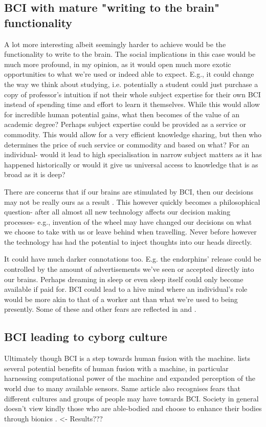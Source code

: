 \documentclass[fleqn,11pt]{olplainarticle}
\begin{document}
\subsection{BCI with mature "writing to the brain" functionality}
A lot more interesting albeit seemingly harder to achieve would be the functionality to write to the brain. The social implications in this case would be much more profound, in my opinion, as it would open much more exotic opportunities to what we're used or indeed able to expect. E.g., it could change the way we think about studying, i.e. potentially a student could just purchase a copy of professor's intuition if not their whole subject expertise for their own BCI instead of spending time and effort to learn it themselves. While this would allow for incredible human potential gains, what then becomes of the value of an academic degree? Perhaps subject expertise could be provided as a service or commodity. This would allow for a very efficient knowledge sharing, but then who determines the price of such service or commodity and based on what? For an individual- would it lead to high specialisation in narrow subject matters as it has happened historically or would it give us universal access to knowledge that is as broad as it is deep? 

There are concerns that if our brains are stimulated by BCI, then our decisions may not be really ours as a result \cite{kogel2019using}. This however quickly becomes a philosophical question- after all almost all new technology affects our decision making processes- e.g., invention of the wheel may have changed our decisions on what we choose to take with us or leave behind when travelling. Never before however the technology has had the potential to inject thoughts into our heads directly.

It could have much darker connotations too. E.g. the endorphins' release could be controlled by the amount of advertisements we've seen or accepted directly into our brains. Perhaps dreaming in sleep or even sleep itself could only become available if paid for. BCI could lead to a hive mind where an individual's role would be more akin to that of a worker ant than what we're used to being presently. Some of these and other fears are reflected in \cite{liberatore_2021} and \cite{warwick2003cyborg}.

\subsection{BCI leading to cyborg culture}
Ultimately though BCI is a step towards human fusion with the machine. \cite{warwick2003cyborg} lists several potential benefits of human fusion with a machine, in particular harnessing computational power of the machine and expanded perception of the world due to many available sensors. Same article also recognises fears that different cultures and groups of people may have towards BCI. Society in general doesn't view kindly those who are able-bodied and choose to enhance their bodies through bionics \cite {meyer2018disabled}. <- Results???
\end{document}
